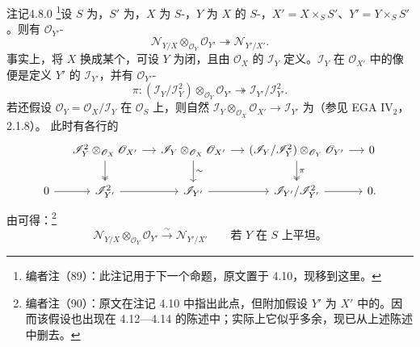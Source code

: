 \begin{SGAresult}{注记}{4.8.0}
\footnote{编者注（89）：此注记用于下一个命题，原文置于 4.10，现移到这里。}设 $S$ 为，$S'$ 为，$X$ 为 $S$-，$Y$ 为 $X$ 的 $S$-，$X'=X\times_S S'$、$Y'=Y\times_S S'$。则有 $\mathscr O_{Y'}$-
\[\mathscr N_{Y/X}\otimes_{\mathscr O_Y}\mathscr O_{Y'}\twoheadrightarrow\mathscr N_{Y'/X'}.\]
事实上，将 $X$ 换成某个，可设 $Y$ 为闭，且由 $\mathscr O_X$ 的 $\mathscr I_Y$ 定义。$\mathscr I_Y$ 在 $\mathscr O_{X'}$ 中的像便是定义 $Y'$ 的 $\mathscr I_{Y'}$，并有 $\mathscr O_{Y'}$-
\[\pi:(\mathscr I_Y/\mathscr I_Y^2)\otimes_{\mathscr O_Y}\mathscr O_{Y'}\twoheadrightarrow\mathscr I_{Y'}/\mathscr I_{Y'}^2.\]
若还假设 $\mathscr O_Y=\mathscr O_X/\mathscr I_Y$ 在 $\mathscr O_S$ 上，则自然 $\mathscr I_Y\otimes_{\mathscr O_X}\mathscr O_{X'}\to\mathscr I_{Y'}$ 为（参见 EGA IV$_2$，2.1.8）。
此时有各行的
\[
\begin{tikzcd}[column sep=small]
&\mathscr I_Y^2\otimes_{\mathscr O_X}\mathscr O_{X'}\arrow[r]\arrow[d,two heads]&\mathscr I_Y\otimes_{\mathscr O_X}\mathscr O_{X'}\arrow[r]\arrow[d,"\sim"]&(\mathscr I_Y/\mathscr I_Y^2)\otimes_{\mathscr O_Y}\mathscr O_{Y'}\arrow[r]\arrow[d,two heads,"\pi"]&0\\
0\arrow[r]&\mathscr I_{Y'}^2\arrow[r]&\mathscr I_{Y'}\arrow[r]&\mathscr I_{Y'}/\mathscr I_{Y'}^2\arrow[r]&0.
\end{tikzcd}
\]
由可得：\footnote{编者注（90）：原文在注记 4.10 中指出此点，但附加假设 $Y'$ 为 $X'$ 中的。因而该假设也出现在 4.12—4.14 的陈述中；实际上它似乎多余，现已从上述陈述中删去。}
\[\mathscr N_{Y/X}\otimes_{\mathscr O_Y}\mathscr O_{Y'}\xrightarrow\sim\mathscr N_{Y'/X'}\qquad\text{若 $Y$ 在 $S$ 上平坦。}\tag{4.8.0}\]
\end{SGAresult}

